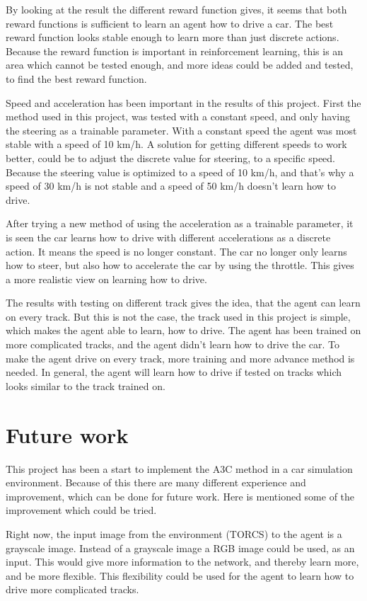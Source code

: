 By looking at the result the different reward function gives, it seems that both reward functions is sufficient to learn an agent how to drive a car. The best reward function looks stable enough to learn more than just discrete actions. Because the reward function is important in reinforcement learning, this is an area which cannot be tested enough, and more ideas could be added and tested, to find the best reward function. 

Speed and acceleration has been important in the results of this project. First the method used in this project, was tested with a constant speed, and only having the steering as a trainable parameter. With a constant speed the agent was most stable with a speed of 10 km/h. A solution for getting different speeds to work better, could be to adjust the discrete value for steering, to a specific speed. Because the steering value is optimized to a speed of 10 km/h, and that’s why a speed of 30 km/h is not stable and a speed of 50 km/h doesn't learn how to drive. 

After trying a new method of using the acceleration as a trainable parameter, it is seen the car learns how to drive with different accelerations as a discrete action. It means the speed is no longer constant. The car no longer only learns how to steer, but also how to accelerate the car by using the throttle. This gives a more realistic view on learning how to drive.  

The results with testing on different track gives the idea, that the agent can learn on every track. But this is not the case, the track used in this project is simple, which makes the agent able to learn, how to drive. The agent has been trained on more complicated tracks, and the agent didn't learn how to drive the car. To make the agent drive on every track, more training and more advance method is needed. In general, the agent will learn how to drive if tested on tracks which looks similar to the track trained on. 
 
\section{Future work}
This project has been a start to implement the A3C method in a car simulation environment. Because of this there are many different experience and improvement, which can be done for future work. Here is mentioned some of the improvement which could be tried.  

Right now, the input image from the environment (TORCS) to the agent is a grayscale image. Instead of a grayscale image a RGB image could be used, as an input. This would give more information to the network, and thereby learn more, and be more flexible. This flexibility could be used for the agent to learn how to drive more complicated tracks.  

